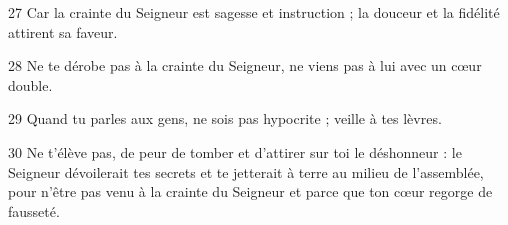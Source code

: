 
27 Car la crainte du Seigneur est sagesse et instruction ; la douceur et la fidélité attirent sa faveur.

28 Ne te dérobe pas à la crainte du Seigneur, ne viens pas à lui avec un cœur double.

29 Quand tu parles aux gens, ne sois pas hypocrite ; veille à tes lèvres.

30 Ne t’élève pas, de peur de tomber et d’attirer sur toi le déshonneur : le Seigneur dévoilerait tes secrets et te jetterait à terre au milieu de l’assemblée, pour n’être pas venu à la crainte du Seigneur et parce que ton cœur regorge de fausseté.